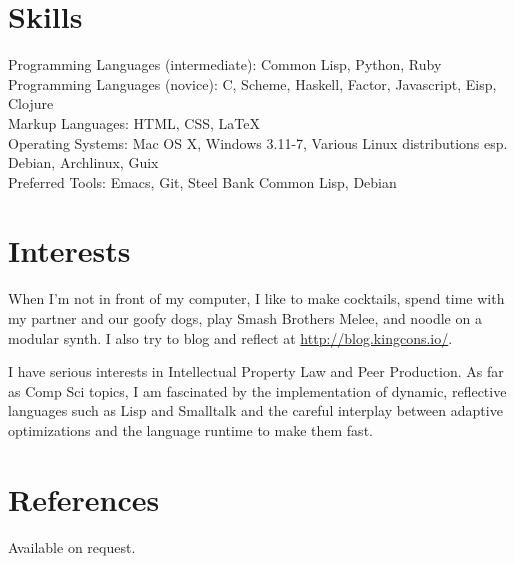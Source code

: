 \documentclass[margintitle,line]{res}
\begin{document}
\begin{resume}
\setlength{\parskip}{1ex}


\section{Skills}

Programming Languages (intermediate): Common Lisp, Python, Ruby \\
Programming Languages (novice): C, Scheme, Haskell, Factor, Javascript, Eisp, Clojure \\
Markup Languages: HTML, CSS, LaTeX \\
Operating Systems: Mac OS X, Windows 3.11-7, Various Linux distributions
esp. Debian, Archlinux, Guix \\
Preferred Tools: Emacs, Git, Steel Bank Common Lisp, Debian \\


\section{Interests}

When I'm not in front of my computer, I like to make cocktails, spend
time with my partner and our goofy dogs, play Smash Brothers Melee,
and noodle on a modular synth. I also try to blog and reflect at
\url{http://blog.kingcons.io/}.

I have serious interests in Intellectual Property Law and Peer Production.
As far as Comp Sci topics, I am fascinated by the implementation of dynamic,
reflective languages such as Lisp and Smalltalk and the careful interplay
between adaptive optimizations and the language runtime to make them fast.


\section{References}

Available on request.

\end{resume}
\end{document}
